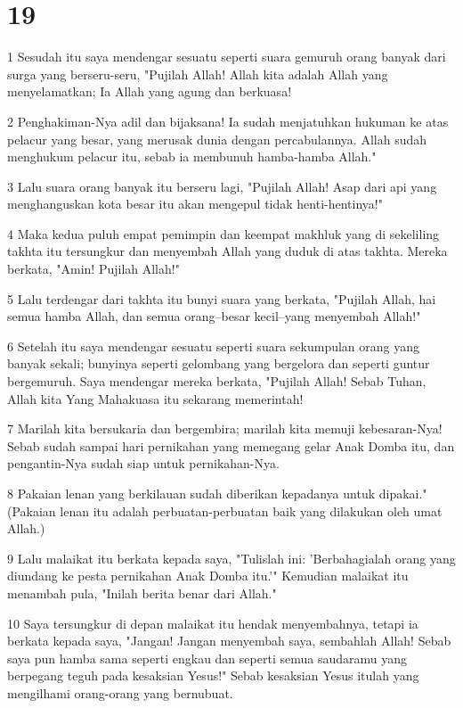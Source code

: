 \chapter{19}

\par 1 Sesudah itu saya mendengar sesuatu seperti suara gemuruh orang banyak dari surga yang berseru-seru, "Pujilah Allah! Allah kita adalah Allah yang menyelamatkan; Ia Allah yang agung dan berkuasa!
\par 2 Penghakiman-Nya adil dan bijaksana! Ia sudah menjatuhkan hukuman ke atas pelacur yang besar, yang merusak dunia dengan percabulannya. Allah sudah menghukum pelacur itu, sebab ia membunuh hamba-hamba Allah."
\par 3 Lalu suara orang banyak itu berseru lagi, "Pujilah Allah! Asap dari api yang menghanguskan kota besar itu akan mengepul tidak henti-hentinya!"
\par 4 Maka kedua puluh empat pemimpin dan keempat makhluk yang di sekeliling takhta itu tersungkur dan menyembah Allah yang duduk di atas takhta. Mereka berkata, "Amin! Pujilah Allah!"
\par 5 Lalu terdengar dari takhta itu bunyi suara yang berkata, "Pujilah Allah, hai semua hamba Allah, dan semua orang--besar kecil--yang menyembah Allah!"
\par 6 Setelah itu saya mendengar sesuatu seperti suara sekumpulan orang yang banyak sekali; bunyinya seperti gelombang yang bergelora dan seperti guntur bergemuruh. Saya mendengar mereka berkata, "Pujilah Allah! Sebab Tuhan, Allah kita Yang Mahakuasa itu sekarang memerintah!
\par 7 Marilah kita bersukaria dan bergembira; marilah kita memuji kebesaran-Nya! Sebab sudah sampai hari pernikahan yang memegang gelar Anak Domba itu, dan pengantin-Nya sudah siap untuk pernikahan-Nya.
\par 8 Pakaian lenan yang berkilauan sudah diberikan kepadanya untuk dipakai." (Pakaian lenan itu adalah perbuatan-perbuatan baik yang dilakukan oleh umat Allah.)
\par 9 Lalu malaikat itu berkata kepada saya, "Tulislah ini: 'Berbahagialah orang yang diundang ke pesta pernikahan Anak Domba itu.'" Kemudian malaikat itu menambah pula, "Inilah berita benar dari Allah."
\par 10 Saya tersungkur di depan malaikat itu hendak menyembahnya, tetapi ia berkata kepada saya, "Jangan! Jangan menyembah saya, sembahlah Allah! Sebab saya pun hamba sama seperti engkau dan seperti semua saudaramu yang berpegang teguh pada kesaksian Yesus!" Sebab kesaksian Yesus itulah yang mengilhami orang-orang yang bernubuat.
